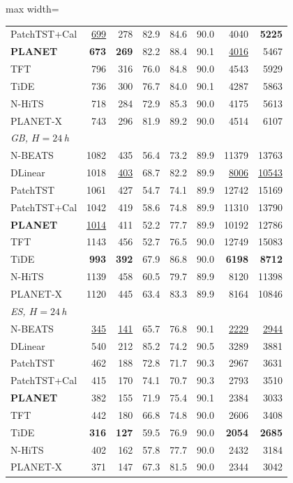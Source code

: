 \begin{table}[!t]
\begin{adjustbox}{max width=\linewidth}
\begin{tabular}{lrrrrrrr}
\quad PatchTST+Cal & \underline{699} & 278 & 82.9 & 84.6 & 90.0 & 4040 & \textbf{5225} \\
\quad \textbf{PLANET} & \textbf{673} & \textbf{269} & 82.2 & 88.4 & 90.1 & \underline{4016} & 5467 \\
\quad TFT & 796 & 316 & 76.0 & 84.8 & 90.0 & 4543 & 5929 \\
\quad TiDE & 736 & 300 & 76.7 & 84.0 & 90.1 & 4287 & 5863 \\
\quad N-HiTS & 718 & 284 & 72.9 & 85.3 & 90.0 & 4175 & 5613 \\
\quad PLANET-X & 743 & 296 & 81.9 & 89.2 & 90.0 & 4514 & 6107 \\
\midrule
\multicolumn{8}{l}{\textit{GB, $H=24$\,h}} \\
\quad N-BEATS & 1082 & 435 & 56.4 & 73.2 & 89.9 & 11379 & 13763 \\
\quad DLinear & 1018 & \underline{403} & 68.7 & 82.2 & 89.9 & \underline{8006} & \underline{10543} \\
\quad PatchTST & 1061 & 427 & 54.7 & 74.1 & 89.9 & 12742 & 15169 \\
\quad PatchTST+Cal & 1042 & 419 & 58.6 & 74.8 & 89.9 & 11310 & 13790 \\
\quad \textbf{PLANET} & \underline{1014} & 411 & 52.2 & 77.7 & 89.9 & 10192 & 12786 \\
\quad TFT & 1143 & 456 & 52.7 & 76.5 & 90.0 & 12749 & 15083 \\
\quad TiDE & \textbf{993} & \textbf{392} & 67.9 & 86.8 & 90.0 & \textbf{6198} & \textbf{8712} \\
\quad N-HiTS & 1139 & 458 & 60.5 & 79.7 & 89.9 & 8120 & 11398 \\
\quad PLANET-X & 1120 & 445 & 63.4 & 83.3 & 89.9 & 8164 & 10846 \\
\midrule
\multicolumn{8}{l}{\textit{ES, $H=24$\,h}} \\
\quad N-BEATS & \underline{345} & \underline{141} & 65.7 & 76.8 & 90.1 & \underline{2229} & \underline{2944} \\
\quad DLinear & 540 & 212 & 85.2 & 74.2 & 90.5 & 3289 & 3881 \\
\quad PatchTST & 462 & 188 & 72.8 & 71.7 & 90.3 & 2967 & 3631 \\
\quad PatchTST+Cal & 415 & 170 & 74.1 & 70.7 & 90.3 & 2793 & 3510 \\
\quad \textbf{PLANET} & 382 & 155 & 71.9 & 75.4 & 90.1 & 2384 & 3033 \\
\quad TFT & 442 & 180 & 66.8 & 74.8 & 90.0 & 2606 & 3408 \\
\quad TiDE & \textbf{316} & \textbf{127} & 59.5 & 76.9 & 90.0 & \textbf{2054} & \textbf{2685} \\
\quad N-HiTS & 402 & 162 & 57.8 & 77.7 & 90.0 & 2432 & 3184 \\
\quad PLANET-X & 371 & 147 & 67.3 & 81.5 & 90.0 & 2344 & 3042 \\
\bottomrule
\end{tabular}
\end{adjustbox}
\end{table}
